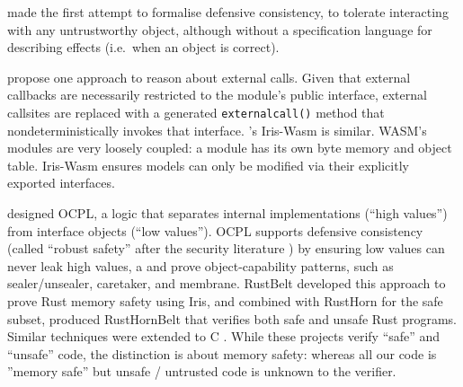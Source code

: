 \citet{Murray10dphil} made the first attempt to formalise defensive
consistency, %
to tolerate interacting with any untrustworthy object,
although without a specification language for describing effects
(i.e.\ when an object is correct).

 \citet{CassezFQ24} propose one approach to reason about external calls.
Given that external callbacks are necessarily restricted to the module's public interface,
external callsites are replaced  with a
generated \texttt{externalcall()} method that  nondeterministically invokes that interface.
\citet{iris-wasm-pldi2023}'s Iris-Wasm is similar.
WASM's
modules are very loosely coupled: a module
has its own byte memory
and object table.
Iris-Wasm ensures models 
can only be
modified via their explicitly exported interfaces. 
 
 

\citet{ddd}  designed OCPL, a logic
that separates internal implementations (``high values'')
from interface objects
(``low values''). %
OCPL supports defensive
consistency %
(called ``robust safety'' after the
security literature \cite{Bengtson})
by ensuring
low values can never leak high values, a %
and 
prove %
object-capability patterns, such as
sealer/unsealer, caretaker, and membrane.
%
%
RustBelt \cite{RustBelt18}
developed this approach to prove Rust memory safety using Iris\cite{iris-jfp2018},
and combined with RustHorn \cite{RustHorn-toplas2021} for the safe subset,
produced RustHornBelt \cite{RustHornBelt-pldi2022} that verifies
both safe and unsafe Rust programs. %
Similar techniques were extended to C \cite{RefinedC-pldi2021}.
While these projects 
verify ``safe'' and ``unsafe'' code, 
%
the distinction is about memory safety:%
%
%
%
whereas all our code is ''memory safe''
but unsafe / untrusted code is unknown to the verifier.

